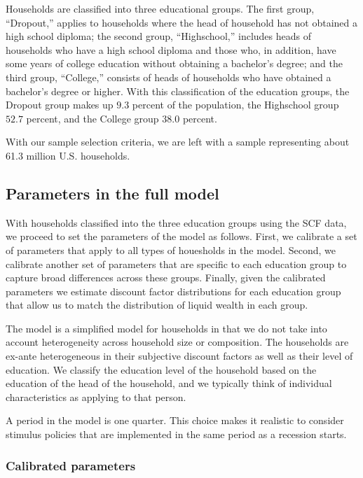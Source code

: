 \documentclass[\econtexRoot/HAFiscal]{subfiles}
\begin{document}
Households are classified into three educational groups.
The first group, ``Dropout,'' applies to households where the head of household has not obtained a high school diploma; the second group, ``Highschool,'' includes heads of households who have a high school diploma and those who, in addition, have some years of college education without obtaining a bachelor's degree; and the third group, ``College,'' consists of heads of households who have obtained a bachelor's degree or higher.
With this classification of the education groups, the Dropout group makes up $9.3$ percent of the population, the Highschool group $52.7$ percent, and the College group $38.0$ percent.


With our sample selection criteria, we are left with a sample representing about 61.3 million U.S.
households.

\subsection{Parameters in the full model}
\notinsubfile{\label{sec:paramsFull}}

With households classified into the three education groups using the SCF data, we proceed to set the parameters of the model as follows.
First, we calibrate a set of parameters that apply to all types of houesholds in the model.
Second, we calibrate another set of parameters that are specific to each education group to capture broad differences across these groups.
Finally, given the calibrated parameters we estimate discount factor distributions for each education group that allow us to match the distribution of liquid wealth in each group.


The model is a simplified model for households in that we do not take into account heterogeneity across household size or composition.
The households are ex-ante heterogeneous in their subjective discount factors as well as their level of education.
We classify the education level of the household based on the education of the head of the household, and we typically think of individual characteristics as applying to that person.


A period in the model is one quarter.
This choice makes it realistic to consider stimulus policies that are implemented in the same period as a recession starts.


\subsubsection{Calibrated parameters} 
\notinsubfile{\label{sec:calib}}
\end{document}

